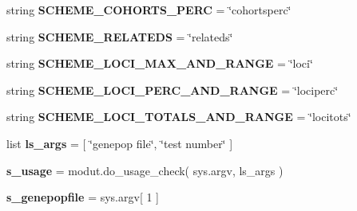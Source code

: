 \begin{DoxyCompactItemize}
\item 
string {\bfseries S\+C\+H\+E\+M\+E\+\_\+\+C\+O\+H\+O\+R\+T\+S\+\_\+\+P\+E\+RC} = \char`\"{}cohortsperc\char`\"{}\hypertarget{namespacenegui_1_1genepopfilesampler_a7f5a5b4d8448a86c851646fbb8d923c6}{}\label{namespacenegui_1_1genepopfilesampler_a7f5a5b4d8448a86c851646fbb8d923c6}

\item 
string {\bfseries S\+C\+H\+E\+M\+E\+\_\+\+R\+E\+L\+A\+T\+E\+DS} = \char`\"{}relateds\char`\"{}\hypertarget{namespacenegui_1_1genepopfilesampler_acec997bb8951673a46f30157dd69973e}{}\label{namespacenegui_1_1genepopfilesampler_acec997bb8951673a46f30157dd69973e}

\item 
string {\bfseries S\+C\+H\+E\+M\+E\+\_\+\+L\+O\+C\+I\+\_\+\+M\+A\+X\+\_\+\+A\+N\+D\+\_\+\+R\+A\+N\+GE} = \char`\"{}loci\char`\"{}\hypertarget{namespacenegui_1_1genepopfilesampler_a2c2d4868169126359e5c546ed7cd429c}{}\label{namespacenegui_1_1genepopfilesampler_a2c2d4868169126359e5c546ed7cd429c}

\item 
string {\bfseries S\+C\+H\+E\+M\+E\+\_\+\+L\+O\+C\+I\+\_\+\+P\+E\+R\+C\+\_\+\+A\+N\+D\+\_\+\+R\+A\+N\+GE} = \char`\"{}lociperc\char`\"{}\hypertarget{namespacenegui_1_1genepopfilesampler_a6e83e86e771a30ab2d457bc0f46517cb}{}\label{namespacenegui_1_1genepopfilesampler_a6e83e86e771a30ab2d457bc0f46517cb}

\item 
string {\bfseries S\+C\+H\+E\+M\+E\+\_\+\+L\+O\+C\+I\+\_\+\+T\+O\+T\+A\+L\+S\+\_\+\+A\+N\+D\+\_\+\+R\+A\+N\+GE} = \char`\"{}locitots\char`\"{}\hypertarget{namespacenegui_1_1genepopfilesampler_a673c0970d35fb8481047f33f4da1b096}{}\label{namespacenegui_1_1genepopfilesampler_a673c0970d35fb8481047f33f4da1b096}

\item 
list {\bfseries ls\+\_\+args} = \mbox{[} \char`\"{}genepop file\char`\"{}, \char`\"{}test number\char`\"{} \mbox{]}\hypertarget{namespacenegui_1_1genepopfilesampler_af0949cf58ac4626034b74cc9feaf35de}{}\label{namespacenegui_1_1genepopfilesampler_af0949cf58ac4626034b74cc9feaf35de}

\item 
{\bfseries s\+\_\+usage} = modut.\+do\+\_\+usage\+\_\+check( sys.\+argv, ls\+\_\+args )\hypertarget{namespacenegui_1_1genepopfilesampler_a50569ca2f7b58beeb1163ff3e3578bc6}{}\label{namespacenegui_1_1genepopfilesampler_a50569ca2f7b58beeb1163ff3e3578bc6}

\item 
{\bfseries s\+\_\+genepopfile} = sys.\+argv\mbox{[} 1 \mbox{]}\hypertarget{namespacenegui_1_1genepopfilesampler_a950ccfdc83d7493167c08843392ce46c}{}\label{namespacenegui_1_1genepopfilesampler_a950ccfdc83d7493167c08843392ce46c}


\end{DoxyCompactItemize}
